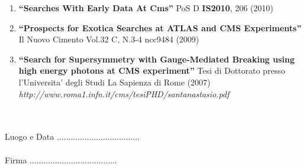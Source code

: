 \documentclass[10pt]{letter}
\begin{document}
\begin{enumerate}

\item%
{\bf ``Searches With Early Data At Cms''}
  {}PoS D {\bf IS2010}, 206 (2010)

\item%
{\bf ``Prospects for Exotica Searches at ATLAS and CMS Experiments''}
  {}Il Nuovo Cimento Vol.32 C, N.3-4 ncc9484 (2009)



\item%
{\bf ``Search for Supersymmetry with Gauge-Mediated Breaking using high energy photons at CMS experiment''}
  {}Tesi di Dottorato presso l'Universita' degli Studi La Sapienza di Rome (2007)
{}{\it http://www.roma1.infn.it/cms/tesiPHD/santanastasio.pdf}


\end{enumerate}

~\\
~\\
Luogo e Data .................................... \\ \\

Firma ......................................
\end{document}

